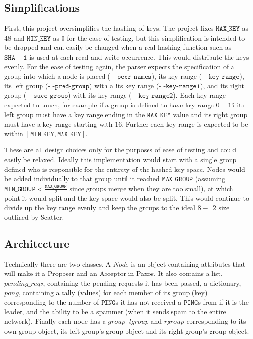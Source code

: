 \documentclass{amsart}
\theoremstyle{definition}
\theoremstyle{remark}
\numberwithin{equation}{section}
\begin{document}
\subsection{Simplifications}
First, this project oversimplifies the hashing of keys. The project fixes $\mathtt{MAX\_KEY}$ as $48$ and $\mathtt{MIN\_KEY}$ as $0$ for the ease of testing, but this simplification is intended to be dropped and can easily be changed when a real hashing function such as $\mathtt{SHA-1}$ is used at each read and write occurrence. This would distribute the keys evenly. For the ease of testing again, the parser expects the specification of a group into which a node is placed (- -$\mathtt{peer}$-$\mathtt{names}$), its key range (- -$\mathtt{key}$-$\mathtt{range}$), its left group (- -$\mathtt{pred}$-$\mathtt{group}$) with a  its key range (- -$\mathtt{key}$-$\mathtt{range1}$), and its right group (- -$\mathtt{succ}$-$\mathtt{group}$) with its key range (- -$\mathtt{key}$-$\mathtt{range2}$). Each key range expected to touch, for example if a group is defined to have key range $0-16$ its left group must have a key range ending in the $\mathtt{MAX\_KEY}$ value and its right group must have a key range starting with $16$. Further each key range is expected to be within $[\mathtt{MIN\_KEY}, \mathtt{MAX\_KEY}]$. 

These are all design choices only for the purposes of ease of testing and could easily be relaxed. Ideally this implementation would start with a single group defined who is responsible for the entirety of the hashed key space. Nodes would be added individually to that group until it reached $\mathtt{MAX\_GROUP}$ (assuming $\mathtt{MIN\_GROUP} < \frac{\mathtt{MAX\_GROUP}}{2}$ since groups merge when they are too small), at which point it would split and the key space would also be split. This would continue to divide up the key range evenly and keep the groups to the ideal $8-12$ size outlined by Scatter.
\subsection{Architecture}
Technically there are two classes. A $Node$ is an object containing attributes that will make it a Proposer and an Acceptor in Paxos. It also contains a list, $pending\_reqs$, containing the pending requests it has been passed, a dictionary, $pong$, containing a tally (values) for each member of its group (key) corresponding to the number of $\mathtt{PING}$s it has not received a $\mathtt{PONG}$s from if it is the leader, and the ability to be a spammer (when it sends spam to the entire network). Finally each node has a $group$, $lgroup$ and $rgroup$ corresponding to its own group object, its left group's group object and its right group's group object.
\end{document}
